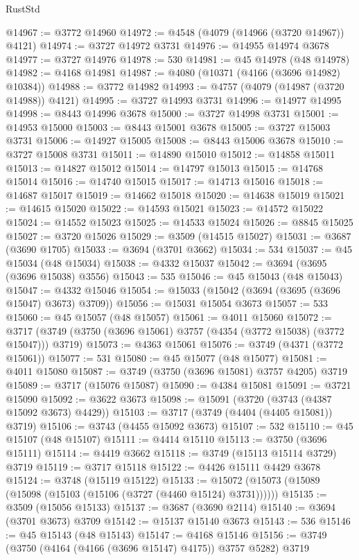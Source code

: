 \begin{lexlean}{RustStd}
\begin{coremodule}
@14967 := @3772 @14960
@14972 := @4548 (@4079 (@14966 (@3720 @14967)) @4121)
@14974 := @3727 @14972 @3731
@14976 := @14955 @14974 @3678
@14977 := @3727 @14976
@14978 := 530
@14981 := @45 @14978 (@48 @14978)
@14982 := @4168 @14981
@14987 := @4080 (@10371 (@4166 (@3696 @14982) @10384))
@14988 := @3772 @14982
@14993 := @4757 (@4079 (@14987 (@3720 @14988)) @4121)
@14995 := @3727 @14993 @3731
@14996 := @14977 @14995
@14998 := @8443 @14996 @3678
@15000 := @3727 @14998 @3731
@15001 := @14953 @15000
@15003 := @8443 @15001 @3678
@15005 := @3727 @15003 @3731
@15006 := @14927 @15005
@15008 := @8443 @15006 @3678
@15010 := @3727 @15008 @3731
@15011 := @14890 @15010
@15012 := @14858 @15011
@15013 := @14827 @15012
@15014 := @14797 @15013
@15015 := @14768 @15014
@15016 := @14740 @15015
@15017 := @14713 @15016
@15018 := @14687 @15017
@15019 := @14662 @15018
@15020 := @14638 @15019
@15021 := @14615 @15020
@15022 := @14593 @15021
@15023 := @14572 @15022
@15024 := @14552 @15023
@15025 := @14533 @15024
@15026 := @8845 @15025
@15027 := @3720 @15026
@15029 := @3509 (@14515 @15027)
@15031 := @3687 (@3690 @1705)
@15033 := @3694 (@3701 @3662)
@15034 := 534
@15037 := @45 @15034 (@48 @15034)
@15038 := @4332 @15037
@15042 := @3694 (@3695 (@3696 @15038) @3556)
@15043 := 535
@15046 := @45 @15043 (@48 @15043)
@15047 := @4332 @15046
@15054 := @15033 (@15042 (@3694 (@3695 (@3696 @15047) @3673) @3709))
@15056 := @15031 @15054 @3673
@15057 := 533
@15060 := @45 @15057 (@48 @15057)
@15061 := @4011 @15060
@15072 := @3717 (@3749 (@3750 (@3696 @15061) @3757 (@4354 (@3772 @15038) (@3772 @15047))) @3719)
@15073 := @4363 @15061
@15076 := @3749 (@4371 (@3772 @15061))
@15077 := 531
@15080 := @45 @15077 (@48 @15077)
@15081 := @4011 @15080
@15087 := @3749 (@3750 (@3696 @15081) @3757 @4205) @3719
@15089 := @3717 (@15076 @15087)
@15090 := @4384 @15081
@15091 := @3721 @15090
@15092 := @3622 @3673
@15098 := @15091 (@3720 (@3743 (@4387 @15092 @3673) @4429))
@15103 := @3717 (@3749 (@4404 (@4405 @15081)) @3719)
@15106 := @3743 (@4455 @15092 @3673)
@15107 := 532
@15110 := @45 @15107 (@48 @15107)
@15111 := @4414 @15110
@15113 := @3750 (@3696 @15111)
@15114 := @4419 @3662
@15118 := @3749 (@15113 @15114 @3729) @3719
@15119 := @3717 @15118
@15122 := @4426 @15111 @4429 @3678
@15124 := @3748 (@15119 @15122)
@15133 := @15072 (@15073 (@15089 (@15098 (@15103 (@15106 (@3727 (@4460 @15124) @3731))))))
@15135 := @3509 (@15056 @15133)
@15137 := @3687 (@3690 @2114)
@15140 := @3694 (@3701 @3673) @3709
@15142 := @15137 @15140 @3673
@15143 := 536
@15146 := @45 @15143 (@48 @15143)
@15147 := @4168 @15146
@15156 := @3749 (@3750 (@4164 (@4166 (@3696 @15147) @4175)) @3757 @5282) @3719

\end{coremodule}
\end{lexlean}
